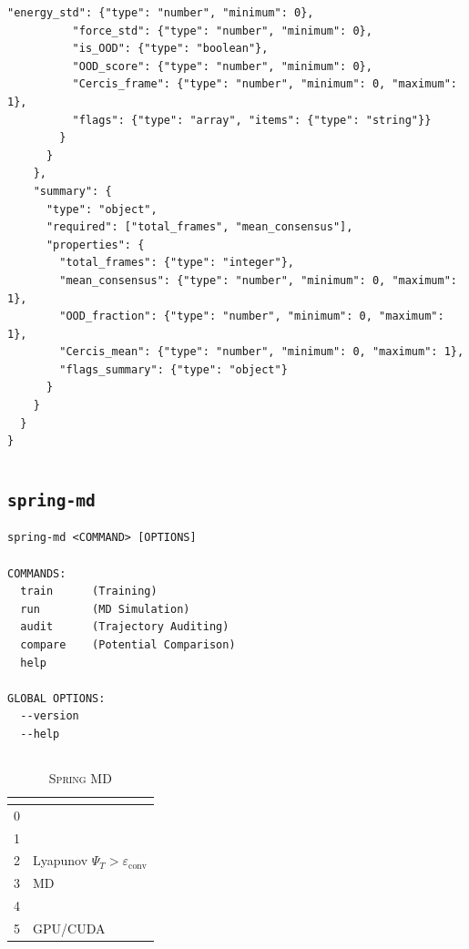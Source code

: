 \documentclass[12pt,a4paper]{article}
\theoremstyle{remark}
\newcommand{\SpringMD}{\textsc{Spring MD}}
\newcommand{\Lyap}{\ensuremath{\Psi}}
\begin{document}
\begin{lstlisting}[caption={ArbiterJSON Schema},label=lst:schema, basicstyle=\ttfamily\tiny]
          "energy_std": {"type": "number", "minimum": 0},
          "force_std": {"type": "number", "minimum": 0},
          "is_OOD": {"type": "boolean"},
          "OOD_score": {"type": "number", "minimum": 0},
          "Cercis_frame": {"type": "number", "minimum": 0, "maximum": 1},
          "flags": {"type": "array", "items": {"type": "string"}}
        }
      }
    },
    "summary": {
      "type": "object",
      "required": ["total_frames", "mean_consensus"],
      "properties": {
        "total_frames": {"type": "integer"},
        "mean_consensus": {"type": "number", "minimum": 0, "maximum": 1},
        "OOD_fraction": {"type": "number", "minimum": 0, "maximum": 1},
        "Cercis_mean": {"type": "number", "minimum": 0, "maximum": 1},
        "flags_summary": {"type": "object"}
      }
    }
  }
}
\end{lstlisting}

\section{}

\subsection*{\texttt{spring-md}}

\begin{lstlisting}[basicstyle=\ttfamily\small, frame=single]
spring-md <COMMAND> [OPTIONS]

COMMANDS:
  train      (Training)
  run        (MD Simulation)
  audit      (Trajectory Auditing)
  compare    (Potential Comparison)
  help      

GLOBAL OPTIONS:
  --version  
  --help     
\end{lstlisting}

\subsection*{}

\begin{table}[H]
\centering
\caption{\SpringMD{}}
\label{tab:exit_codes}
\begin{tabular}{@{}p{2.0cm} p{10.0cm}@{}}
\toprule
\textbf{} & \textbf{} \\
\midrule
0 &  \\
1 &  \\
2 & Lyapunov $\Lyap_T > \varepsilon_{\text{conv}}$ \\
3 & MD \\
4 &  \\
5 & GPU/CUDA \\
\bottomrule
\end{tabular}
\end{table}
\end{document}
